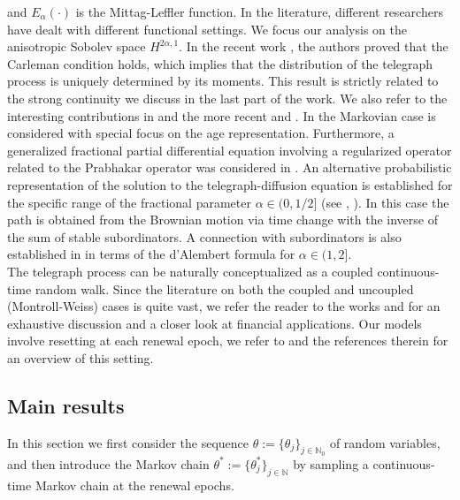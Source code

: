 \documentclass[10pt,a4paper]{article}
\numberwithin{equation}{section}
\theoremstyle{plain}
\theoremstyle{remark}
\begin{document}
and $E_\alpha(\cdot)$ is the Mittag-Leffler function. In the literature, different researchers have dealt with different functional settings. We focus our analysis on the anisotropic Sobolev space $H^{2\alpha, 1}$. In the recent work \cite{AkgPobPoz23}, the authors proved that the Carleman condition holds, which implies that the distribution of the telegraph process is uniquely determined by its moments. This result is strictly related to the strong continuity we discuss in the last part of the work. We also refer to the interesting contributions in \cite{FigCamChiCap08} and the more recent \cite{DeGGar25} and \cite{CinOrs23}. In \cite{GionaDCCK} the Markovian case is considered with special focus on the age representation. Furthermore, a generalized fractional partial differential equation involving a regularized operator related to the Prabhakar operator was considered in \cite{DovPol}. An alternative probabilistic representation of the solution to the telegraph-diffusion equation is established for the specific range of the fractional parameter $\alpha \in (0,1/2]$ (see \cite{DovOrsToa14}, \cite{DovToaOrs14}). In this case the path is obtained from the Brownian motion via time change with the inverse of the sum of stable subordinators. A connection with subordinators is also established in \cite{LLPMee} in terms of the d'Alembert formula for $\alpha \in (1,2]$.   \\


The telegraph process can be naturally conceptualized as a coupled continuous-time random walk. Since the literature on both the coupled and uncoupled (Montroll-Weiss) cases is quite vast, we refer the reader to the works \cite{Meer04,BioToa26} and \cite{ASTT26,SCALAS2006} for an exhaustive discussion and a closer look at financial applications. Our models involve resetting at each renewal epoch, we refer to \cite{ColPag} and the references therein for an overview of this setting.   



\subsection{Main results}

In this section we first consider the sequence $\theta := \{\theta_j\}_{j \in \mathbb{N}_0}$ of random variables, and then introduce the Markov chain $\theta^* := \{\theta^*_j\}_{j \in \mathbb{N}}$ by sampling a continuous-time Markov chain at the renewal epochs.
\end{document}
